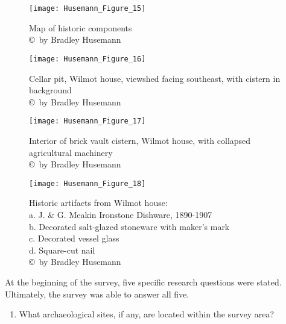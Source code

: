 \begin{figure}[!htb]
	\texttt{[image: Husemann\_Figure\_15]}
	\caption{Map of historic components
		{\normalfont\scriptsize \\ \copyright\ by Bradley Husemann
	}}
	\label{fig:Husemann_Figure_15}
\end{figure}

\begin{figure}[!htb]
	\texttt{[image: Husemann\_Figure\_16]}
	\caption{Cellar pit, Wilmot house, viewshed facing southeast, with cistern in background
		{\normalfont\scriptsize \\ \copyright\ by Bradley Husemann
	}}
	\label{fig:Husemann_Figure_16}
\end{figure}

\begin{figure}[!htb]
	\texttt{[image: Husemann\_Figure\_17]}
	\caption{Interior of brick vault cistern, Wilmot house, with collapsed agricultural machinery
		{\normalfont\scriptsize \\ \copyright\ by Bradley Husemann
	}}
	\label{fig:Husemann_Figure_17}
\end{figure}

\begin{figure}[!htb]
	\texttt{[image: Husemann\_Figure\_18]}
	\caption{Historic artifacts from Wilmot house:\\
		a.	J. \& G. Meakin Ironstone Dishware, 1890-1907\\
		b.	Decorated salt-glazed stoneware with maker’s mark\\
		c.	Decorated vessel glass\\
		d.	Square-cut nail
		{\normalfont\scriptsize \\ \copyright\ by Bradley Husemann
	}}
	\label{fig:Husemann_Figure_18}
\end{figure}


At the beginning of the survey, five specific research questions were stated. Ultimately, the survey was able to answer all five.

\begin{enumerate}
	\item What archaeological sites, if any, are located within the survey area?
\end{enumerate}

